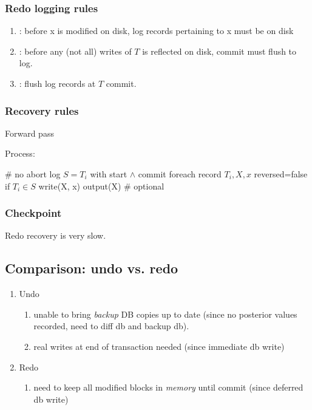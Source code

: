 \documentclass[a4paper]{report}
\begin{document}
\subsubsection{Redo logging rules}
\begin{enumerate}
\item {}: before x is modified on disk, log records pertaining to x must be on disk
\item {}: before any (not all) writes of $T$ is reflected on disk, commit must flush to log.
\item {}: flush log records at $T$ commit. 
\end{enumerate}

\subsubsection{Recovery rules}
Forward pass

Process: 
\begin{pseudo}
# no abort log
$S = T_i$ with start $\wedge$ commit
foreach record $T_i, X, x$ reversed=false
  if $T_i \in S$
    write(X, x)
    output(X) # optional
\end{pseudo}

\subsubsection{Checkpoint}
Redo recovery is very slow. 

\subsection*{Comparison: undo vs. redo }
\begin{enumerate}
\item Undo
\begin{enumerate}
\item unable to bring \textit{backup} DB copies up to date (since no posterior values recorded, need to diff db and backup db).
\item real writes at end of transaction needed (since immediate db write)
\end{enumerate}
\item Redo
\begin{enumerate}
\item need to keep all modified blocks in \textit{memory} until commit (since deferred db write)
\end{enumerate}
\end{enumerate}
\end{document}
